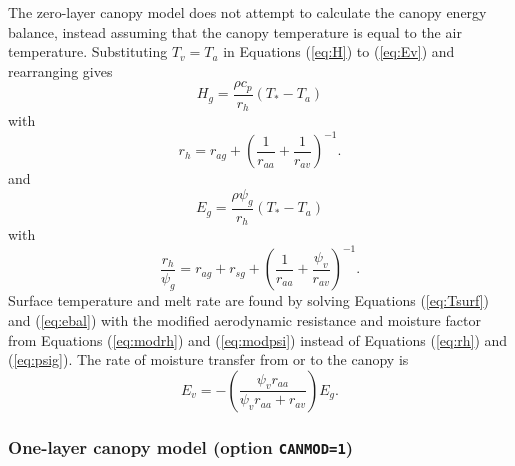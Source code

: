 \documentclass{article}
\begin{document}
The zero-layer canopy model does not attempt to calculate the canopy energy balance, instead assuming that the canopy temperature is equal to the air temperature. Substituting $T_v = T_a$ in Equations (\ref{eq:H}) to (\ref{eq:Ev}) and rearranging gives
\begin{equation}
H_g = \frac{\rho c_p}{r_h}(T_* - T_a)
\end{equation}
with
\begin{equation}
r_h = r_{ag} + \left(\frac{1}{r_{aa}}+\frac{1}{r_{av}}\right)^{-1}.
\label{eq:modrh}
\end{equation}
and 
\begin{equation}
E_g = \frac{\rho\psi_g}{r_h}(T_* - T_a)
\end{equation}
with
\begin{equation}
\frac{r_h}{\psi_g} = r_{ag} + r_{sg} + \left(\frac{1}{r_{aa}}+\frac{\psi_v}{r_{av}}\right)^{-1}.
\label{eq:modpsi}
\end{equation}
Surface temperature and melt rate are found by solving Equations (\ref{eq:Tsurf}) and (\ref{eq:ebal}) with the modified aerodynamic resistance and moisture factor from Equations (\ref{eq:modrh}) and (\ref{eq:modpsi}) instead of Equations (\ref{eq:rh}) and (\ref{eq:psig}). The rate of moisture transfer from or to the canopy is 
\begin{equation}
E_v = -\left(\frac{\psi_v r_{aa}}{\psi_v r_{aa} + r_{av}}\right)E_g.
\end{equation}


\subsubsection{One-layer canopy model (option {\tt CANMOD=1})}
\end{document}
